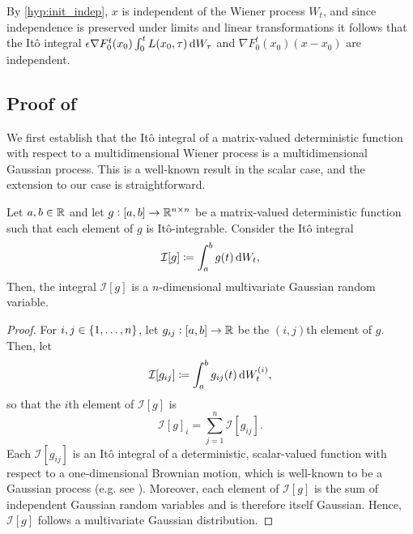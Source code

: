 By \ref{hyp:init_indep}, \(x\) is independent of the Wiener process \(W_t\), and since independence is preserved under limits and linear transformations it follows that the It\^o integral \(\epsilon \nabla F_0^t\!\left(x_0\right)\int_0^t{L\!\left(x_0, \tau\right)\dif W_\tau}\) and \(\nabla F_0^t\!\left(x_0\right)\left(x - x_0\right)\) are independent.


\subsection{Proof of }\label{app:limit_moments_proof}
We first establish that the It\^o integral of a matrix-valued deterministic function with respect to a multidimensional Wiener process is a multidimensional Gaussian process.
This is a well-known result in the scalar case, and the extension to our case is straightforward.
\begin{lemma}\label{lem:det_gauss}
	Let \(a,b \in \mathbb{R}\) and let \(g: [a,b] \to \mathbb{R}^{n\times n}\) be a matrix-valued deterministic function such that each element of \(g\) is It\^o-integrable.
	Consider the It\^o integral
	\[
		\mathcal{I}[g] \coloneqq \int_{a}^b{g(t)\dif W_t},
	\]
	Then, the integral \(\mathcal{I}[g]\) is a \(n\)-dimensional multivariate Gaussian random variable.
\end{lemma}
\begin{proof}
	For \(i,j \in \set{1,\hdots,n}\), let \(g_{ij}: [a,b] \to \mathbb{R}\) be the \((i,j)\)th element of \(g\).
	Then, let
	\[
		\mathcal{I}[g_{ij}] \coloneqq \int_a^b{g_{ij}(t)\dif W_t^{(i)}},
	\]
	so that the \(i\)th element of \(\mathcal{I}[g]\) is
	\[
		\mathcal{I}[g]_i = \sum_{j = 1}^n{\mathcal{I}\left[g_{ij}\right]}.
	\]
	Each \(\mathcal{I}[g_{ij}]\) is an It\^o integral of a deterministic, scalar-valued function with respect to a one-dimensional Brownian motion, which is well-known to be a Gaussian process (e.g. see \citet[Lem. 4.3.11]{Applebaum_2004_LevyProcessesStochastic}).
	Moreover, each element of \(\mathcal{I}[g]\) is the sum of independent Gaussian random variables and is therefore itself Gaussian.
	Hence, \(\mathcal{I}[g]\) follows a multivariate Gaussian distribution.
\end{proof}

